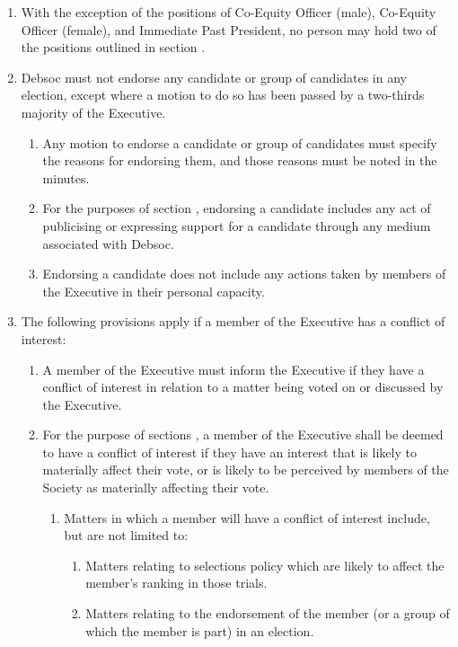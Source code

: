 \begin{enumerate}
\begin{enumerate}
  \end{enumerate}
\item With the exception of the positions of Co-Equity Officer (male), Co-Equity Officer (female), and Immediate Past President, no person may hold two of the positions outlined in section .
\item Debsoc must not endorse any candidate or group of candidates in any election, except where a motion to do so has been passed by a two-thirds majority of the Executive. \label{exec_endorsements}
  \begin{enumerate}
  \item Any motion to endorse a candidate or group of candidates must specify the reasons for endorsing them, and those reasons must be noted in the minutes.
  \item For the purposes of section , endorsing a candidate includes any act of publicising or expressing support for a candidate through any medium associated with Debsoc.
  \item Endorsing a candidate does not include any actions taken by members of the Executive in their personal capacity.
  \end{enumerate}
\item The following provisions apply if a member of the Executive has a conflict of interest: \label{coi_provisions}
  \begin{enumerate}
  \item A member of the Executive must inform the Executive if they have a conflict of interest in relation to a matter being voted on or discussed by the Executive.
  \item For the purpose of sections , a member of the Executive shall be deemed to have a conflict of interest if they have an interest that is likely to materially affect their vote, or is likely to be perceived by members of the Society as materially affecting their vote.
    \begin{enumerate}
    \item Matters in which a member will have a conflict of interest include, but are not limited to:
      \begin{enumerate}
      \item Matters relating to selections policy which are likely to affect the member’s ranking in those trials.
      \item Matters relating to the endorsement of the member (or a group of which the member is part) in an election.

\end{enumerate}
\end{enumerate}
\end{enumerate}
\end{enumerate}

